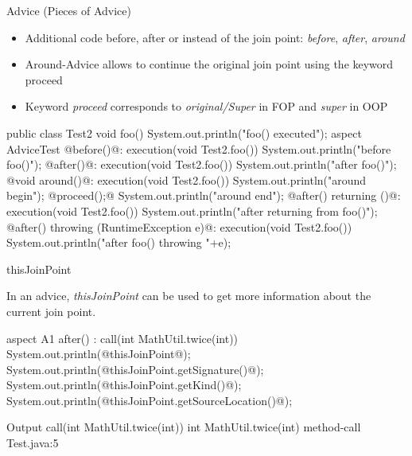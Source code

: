 \begin{frame}[b,fragile]{Advice (Pieces of Advice)}
	\vspace{-12mm}
	\begin{mycolumns}[widths={38}]
		\begin{note}{}
			\begin{itemize}
				\item Additional code before, after or instead of the join point: \emph{before}, \emph{after}, \emph{around}
				\item Around-Advice allows to continue the original join point using the keyword proceed
				\item Keyword \emph{proceed} corresponds to \emph{original/Super} in FOP and \emph{super} in OOP
			\end{itemize}
		\end{note}
	\mynextcolumn
\begin{codetight}{}
public class Test2 {
	void foo() {
		System.out.println("foo() executed");
	}
}
aspect AdviceTest {
	@before()@: execution(void Test2.foo()) {
		System.out.println("before foo()");
	}
	@after()@: execution(void Test2.foo()) {
		System.out.println("after foo()");
	}
	@void around()@: execution(void Test2.foo()) {
		System.out.println("around begin");
		@proceed();@
		System.out.println("around end");
	}
	@after() returning ()@: execution(void Test2.foo()) {
		System.out.println("after returning from foo()");
	}
	@after() throwing (RuntimeException e)@: execution(void Test2.foo()) {
		System.out.println("after foo() throwing "+e);
	}
}
\end{codetight} %
	\end{mycolumns}
\end{frame}

\begin{frame}[fragile]{thisJoinPoint}
	\begin{mycolumns}[widths={30},animation=none]
		\begin{note}{}
			In an advice, \emph{thisJoinPoint} can be used to get more information about the current join point.
		\end{note}
	\mynextcolumn
\begin{codetight}{}
aspect A1 {
	after() : call(int MathUtil.twice(int)) {
		System.out.println(@thisJoinPoint@);
		System.out.println(@thisJoinPoint.getSignature()@);
		System.out.println(@thisJoinPoint.getKind()@);
		System.out.println(@thisJoinPoint.getSourceLocation()@);
	}
}
\end{codetight}
\begin{codetight}{Output}
call(int MathUtil.twice(int))
int MathUtil.twice(int)
method-call
Test.java:5
\end{codetight}
	\end{mycolumns}
\end{frame}

